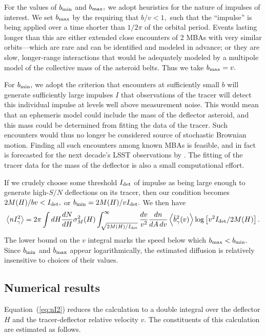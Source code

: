 \documentclass[linenumbers, onecolumn]{aastex631}
\newcommand{\eqq}[1]{Equation~(\ref{#1})}
\begin{document}
For the values of $b_{\rm min}$ and $b_{\rm max},$ we adopt heuristics
for the nature of impulses of interest.  We set $b_{\rm max}$ by the
requiring that $b/v<1,$ such that the ``impulse'' is being applied
over a time shorter than $1/2\pi$ of the orbital period.  Events
lasting longer than this are either extended close encounters of 2
MBAs with very similar orbits---which are rare and can be identified
and modeled in advance; or they are slow, longer-range interactions
that would be adequately modeled by a multipole model of the
collective mass of the asteroid belts.  Thus we take $b_{\rm max}=v.$

For $b_{\rm min},$ we adopt the criterion that encounters at
sufficiently small $b$ will generate sufficiently large impulses $I$
that observations of the tracer will detect this individual impulse at
levels well above measurement noise.  This would mean that an
ephemeris model could include the mass of the deflector asteroid, and
this mass could be determined from fitting the data of the tracer.
Such encounters would thus no longer be considered source of
stochastic Brownian motion.  Finding all such encounters among known
MBAs is feasible, and in fact is forecasted for the next decade's LSST
observations by
\citet{negin}. The fitting of the tracer data for the mass of the
deflector is also a small computational effort.

If we crudely choose some threshold
$I_{\rm det}$ of impulse as being large enough to generate high-$S/N$
deflections on its tracer, then our condition becomes $2M(H)/bv <
I_{\rm det},$ or $b_{\rm min}=2M(H)/vI_{\rm det}.$  We then have
\begin{equation}
   \left\langle n I_\gamma^2 \right\rangle = 
2\pi \int dH \frac{dN}{dH} \sigma^2_M(H)  \int_{\sqrt{2M(H)/I_{\rm
      det}}}^\infty \frac{dv}{v^2} 
        \frac{dn}{dA\,dv}  \left\langle\hat b_\gamma^2(v)\right\rangle
        \log \left[v^2 I_{\rm det}/2M(H)\right].
        \label{eq:nI2}
      \end{equation}
The lower bound on the $v$ integral marks the speed below which
$b_{\rm max}<b_{\rm min}.$  Since $b_{\rm min}$ and $b_{\rm max}$
appear logarithmically, the estimated diffusion is relatively insensitive to choices of
their values.

\subsection{Numerical results}
\eqq{eq:nI2} reduces the calculation to a double integral over the
deflector $H$ and the tracer-deflector relative velocity $v.$  The
constituents of this calculation are estimated as follows.
\end{document}
